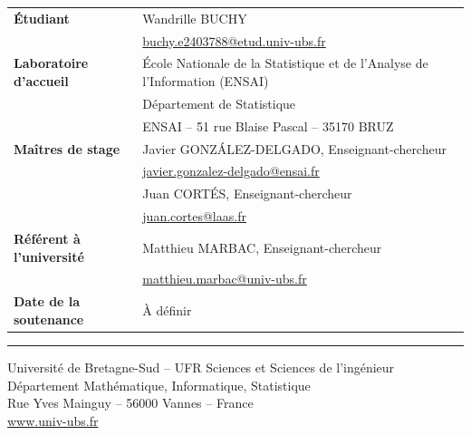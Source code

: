 \documentclass[a4paper,12pt]{article}
\begin{document}
\renewcommand{\arraystretch}{1.6}
\begin{tabularx}{\textwidth}{|>{\bfseries}p{4cm}|X|}
    \hline
    Étudiant
        & Wandrille BUCHY \\
        & \href{mailto:buchy.e2403788@etud.univ-ubs.fr}{buchy.e2403788@etud.univ-ubs.fr} \\
    \hline
    Laboratoire d'accueil
        & École Nationale de la Statistique et de l'Analyse de l'Information (ENSAI) \\
        & Département de Statistique \\
        & ENSAI -- 51 rue Blaise Pascal -- 35170 BRUZ \\
    \hline
    Maîtres de stage
        & Javier GONZÁLEZ-DELGADO, Enseignant-chercheur \\
        & \href{mailto:javier.gonzalez-delgado@ensai.fr}{javier.gonzalez-delgado@ensai.fr} \\[4pt]
        & Juan CORTÉS, Enseignant-chercheur \\
        & \href{mailto:juan.cortes@laas.fr}{juan.cortes@laas.fr} \\
    \hline
    Référent à l'université
        & Matthieu MARBAC, Enseignant-chercheur \\
        & \href{mailto:matthieu.marbac@univ-ubs.fr}{matthieu.marbac@univ-ubs.fr} \\
    \hline
    Date de la soutenance
        & À définir \\
    \hline
\end{tabularx}

\vfill


\noindent\rule{\textwidth}{0.4pt}
\begin{flushleft}
    \small
    Université de Bretagne-Sud -- UFR Sciences et Sciences de l'ingénieur\\
    Département Mathématique, Informatique, Statistique\\
    Rue Yves Mainguy -- 56000 Vannes -- France\\
    \href{http://www.univ-ubs.fr}{www.univ-ubs.fr}
\end{flushleft}


\newpage
\tableofcontents
\end{document}
